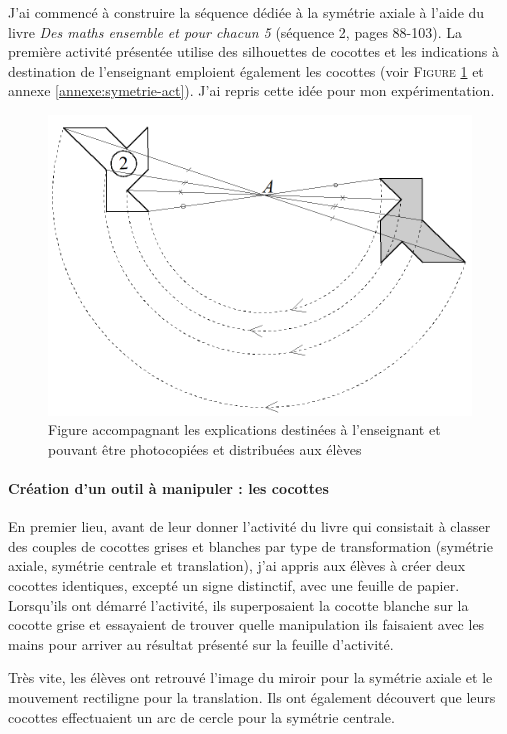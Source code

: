 
J'ai commencé à construire la séquence dédiée à la symétrie axiale à l'aide du livre \textit{Des maths ensemble et pour chacun 5} \cite{mepcc} (séquence 2, pages 88-103). La première activité présentée utilise des silhouettes de cocottes et les indications à destination de l'enseignant emploient également les cocottes (voir \textsc{Figure \ref{fig:cocottes}} et annexe \ref{annexe:symetrie-act}). J'ai repris cette idée pour mon expérimentation.

\begin{figure}[h!]
    \centering
    \includegraphics[width=0.6\linewidth]{img/cocottesmepcc.png}
    \caption{Figure accompagnant les explications destinées à l'enseignant et pouvant être photocopiées et distribuées aux élèves}
    \label{fig:cocottes}
\end{figure}

\paragraph{Création d'un outil à manipuler : les cocottes}

En premier lieu, avant de leur donner l'activité du livre qui consistait à classer des couples de cocottes grises et blanches par type de transformation (symétrie axiale, symétrie centrale et translation), j'ai appris aux élèves à créer deux cocottes identiques, excepté un signe distinctif, avec une feuille de papier. Lorsqu'ils ont démarré l'activité, ils superposaient la cocotte blanche sur la cocotte grise et essayaient de trouver quelle manipulation ils faisaient avec les mains pour arriver au résultat présenté sur la feuille d'activité.

Très vite, les élèves ont retrouvé l'image du miroir pour la symétrie axiale et le mouvement rectiligne pour la translation. Ils ont également découvert que leurs cocottes effectuaient un arc de cercle pour la symétrie centrale.

